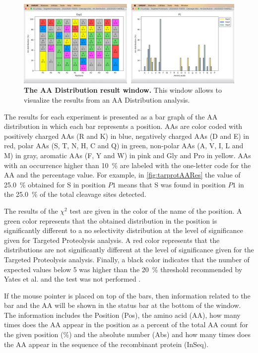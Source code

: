 \begin{figure}[h]
    \centering
    \includegraphics[width=1.0\textwidth]{./IMAGES/MOD-TARPROT/tarprot-aa.jpg}
    \caption[The AA Distribution result window]{\textbf{The AA Distribution result
    window.} This window allows to visualize the results from an AA Distribution
    analysis.}
    \label{fig:tarprotAARes}
    \vspace{-5pt}
\end{figure}

The results for each experiment is presented as a bar graph of the AA distribution
in which each bar represents a position. AAs are color coded with positively charged
AAs (R and K) in blue, negatively charged AAs (D and E) in red, polar AAs (S, T,
N, H, C and Q) in green, non-polar AAs (A, V, I, L and M) in gray, aromatic AAs
(F, Y and W) in pink and Gly and Pro in yellow. AAs with an occurrence higher than
\SI{10}{\percent} are labeled with the one-letter code for the AA and the percentage
value. For example, in \autoref{fig:tarprotAARes} the value of \SI{25.0}{\percent}
obtained for S in position \(P1\) means that S was found in position \(P1\) in the
\SI{25.0}{\percent} of the total cleavage sites detected.

The results of the $\chi^2$ test are given in the color of the name of the position.
A green color represents that the obtained distribution in the position is significantly
different to a no selectivity distribution at the level of significance given for
Targeted Proteolysis analysis. A red color represents that the distributions are
not significantly different at the level of significance given for the Targeted
Proteolysis analysis. Finally, a black color indicates that the number of expected
values below 5 was higher than the \SI{20}{\percent} threshold recommended by Yates
et al. and the test was not performed \cite{Yates1999}.

If the mouse pointer is placed on top of the bars, then information related to the
bar and the AA will be shown in the status bar at the bottom of the window. The
information includes the Position (Pos), the amino acid (AA), how many times does
the AA appear in the position as a percent of the total AA count for the given position
(\%) and the absolute number (Abs) and how many times does the AA appear in the sequence
of the recombinant protein (InSeq).

